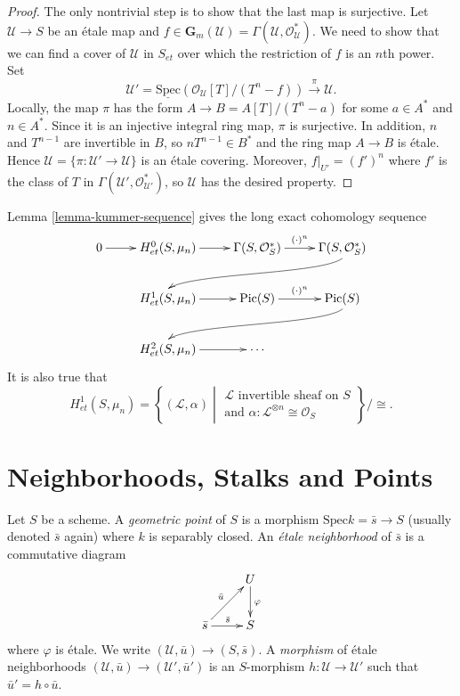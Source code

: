 \begin{proof}
The only nontrivial step is to show that the last map is surjective. Let
$\mathcal{U} \to S$ be an \'etale map and $f \in \mathbf{G}_m(\mathcal{U}) =
\Gamma(\mathcal{U}, \mathcal{O}_\mathcal{U}^*)$. We need to show that we can
find a cover of $\mathcal{U}$ in $S_{et}$ over which the restriction of $f$ is
an $n$th power. Set
$$
\mathcal{U}' = \underline{\text{Spec}} (\mathcal{O}_\mathcal{U}[T] / (T^n-f))
\xrightarrow{\pi} \mathcal{U}.
$$
Locally, the map $\pi$ has the form $A \to B = A[T] / (T^n-a)$ for some $a \in
A^*$ and $n \in A^*$. Since it is an injective integral ring map, $\pi$ is
surjective. In addition, $n$ and $T^{n-1}$ are invertible in $B$, so $nT^{n-1}
\in B^*$ and the ring map $A \to B$ is \'etale. Hence $\mathcal{U} = \{\pi :
\mathcal{U}' \to \mathcal{U}\}$ is an \'etale covering. Moreover, $f|_{U'} =
(f')^n$ where $f'$ is the class of $T$ in $\Gamma(\mathcal{U}',
\mathcal{O}_{\mathcal{U}'}^*)$, so $\mathcal{U}$ has the desired property.
\end{proof}

\noindent
Lemma \ref{lemma-kummer-sequence} gives the long exact cohomology sequence
$$
\xymatrix{
0 \ar[r] & H_{et}^0(S, \mu_n) \ar[r] & \Gamma(S, \mathcal{O}_S^*)
\ar^{(\cdot)^n}[r] & \Gamma(S, \mathcal{O}_S^*)
\ar@(rd,ul)[rdllllr]
\\
& H_{et}^1(S, \mu_n) \ar[r] & \text{Pic}(S) \ar^{(\cdot)^n}[r] & \text{Pic} (S)
\ar@(rd,ul)[rdllllr] \\
& H_{et}^2(S, \mu_n) \ar[r] & \cdots
}
$$
It is also true that
$$
H_{et}^1(S, \mu_n) = \left\{(\mathcal{L}, \alpha)\;
\left| \;
\begin{matrix}
\mathcal{L}\text{ invertible sheaf on } S \\
\text{and }\alpha: \mathcal{L}^{\otimes n} \cong \mathcal{O}_S
\end{matrix}
\right.
\right\}
\Big/\cong.
$$




\section{Neighborhoods, Stalks and Points}
\label{section-stalks}

\begin{definition}
\label{definition-geometric-point}
Let $S$ be a scheme. A {\it geometric point} of $S$ is a morphism $\text{Spec}
k = \bar s \to S$ (usually denoted $\bar s$ again) where $k$ is separably
closed. An {\it \'etale neighborhood} of $\bar s$ is a commutative diagram
$$
\xymatrix{
& U \ar^{\varphi}[d] \\
{\bar s} \ar^{\bar s}[r] \ar^{\bar u}[ur] & S
}
$$
where $\varphi$ is \'etale. We write $(\mathcal{U}, \bar u)\to (S, \bar s)$. A
{\it morphism} of \'etale neighborhoods $(\mathcal{U}, \bar u)\to
(\mathcal{U}',\bar u')$ is an $S$-morphism $h: \mathcal{U}\to \mathcal{U}'$
such that $\bar u'=h\circ\bar u$.
\end{definition}

